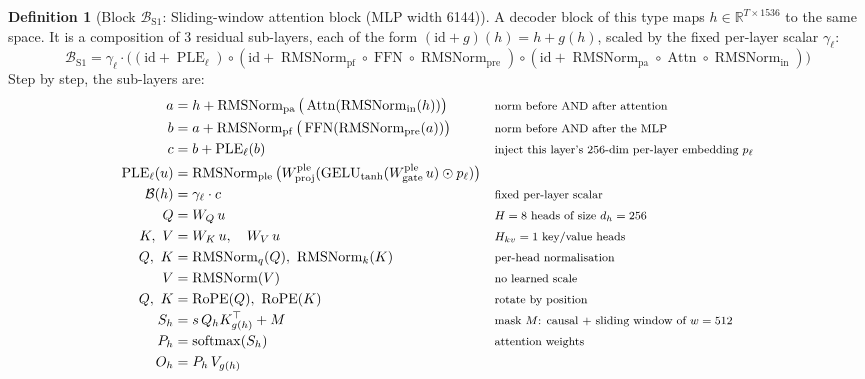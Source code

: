 \documentclass[10pt,a4paper]{article}
\newcommand{\op}[1]{\operatorname{#1}}
\theoremstyle{definition}
\newtheorem{definition}{Definition}[section]
\begin{document}
\begin{definition}[Block $\mathcal{B}_{\mathrm{S1}}$: Sliding-window attention block (MLP width 6144)]
A decoder block of this type maps $h\in\mathbb{R}^{T\times 1536}$ to the same space. It is a composition of 3 residual sub-layers, each of the form $(\mathrm{id}+g)(h)=h+g(h)$, scaled by the fixed per-layer scalar $\gamma_\ell$:
\begin{equation}
  \mathcal{B}_{\mathrm{S1}} = \gamma_\ell\cdot\big((\mathrm{id}+\op{PLE}_\ell)\circ(\mathrm{id}+\op{RMSNorm}_{\mathrm{pf}}\circ\op{FFN}\circ \op{RMSNorm}_{\mathrm{pre}})\circ(\mathrm{id}+\op{RMSNorm}_{\mathrm{pa}}\circ \op{Attn}\circ \op{RMSNorm}_{\mathrm{in}})\big)
\end{equation}
Step by step, the sub-layers are:
\begin{align*}
  a &= h + \op{RMSNorm}_{\mathrm{pa}}\big(\op{Attn}(\op{RMSNorm}_{\mathrm{in}}(h))\big) && \text{\footnotesize norm before AND after attention} \\
  b &= a + \op{RMSNorm}_{\mathrm{pf}}\big(\op{FFN}(\op{RMSNorm}_{\mathrm{pre}}(a))\big) && \text{\footnotesize norm before AND after the MLP} \\
  c &= b + \op{PLE}_\ell(b) && \text{\footnotesize inject this layer's 256-dim per-layer embedding $p_\ell$} \\
  \op{PLE}_\ell(u) &= \op{RMSNorm}_{\mathrm{ple}}\big(W^{\mathrm{ple}}_{\mathrm{proj}}(\op{GELU}_{\tanh}(W^{\mathrm{ple}}_{\mathrm{gate}}\,u)\odot p_\ell)\big) \\
  \mathcal{B}(h) &= \gamma_\ell\cdot c && \text{\footnotesize fixed per-layer scalar} \\
  Q &= W_Q\,u && \text{\footnotesize $H=8$ heads of size $d_h=256$} \\
  K,\ V &= W_K\,u,\quad W_V\,u && \text{\footnotesize $H_{kv}=1$ key/value heads} \\
  Q,\ K &= \op{RMSNorm}_q(Q),\ \op{RMSNorm}_k(K) && \text{\footnotesize per-head normalisation} \\
  V &= \op{RMSNorm}(V) && \text{\footnotesize no learned scale} \\
  Q,\ K &= \op{RoPE}(Q),\ \op{RoPE}(K) && \text{\footnotesize rotate by position} \\
  S_h &= s\, Q_h K_{g(h)}^{\top} + M && \text{\footnotesize mask $M$: causal + sliding window of $w=512$} \\
  P_h &= \op{softmax}(S_h) && \text{\footnotesize attention weights} \\
  O_h &= P_h\, V_{g(h)} \\

\end{align*}
\end{definition}
\end{document}

